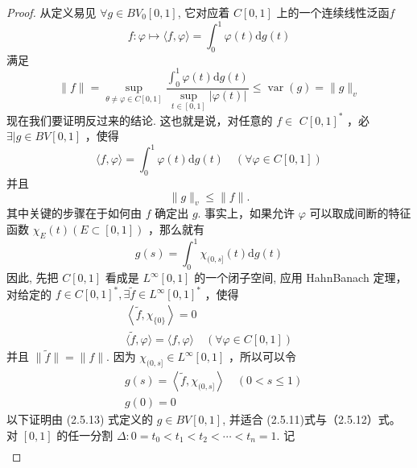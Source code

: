\documentclass[lang=cn,newtx,10pt,scheme=chinese,thmcnt=chapter]{elegantbook}
\newcommand{\dif}{\mathrm{d}}
\begin{document}
\begin{proof}
从定义易见 $\forall g \in B V_0[0,1]$, 它对应着 $C[0,1]$ 上的一个连续线性泛函$f$
\begin{equation*}
f:\varphi \mapsto\langle f, \varphi\rangle=\int_0^1 \varphi(t) \dif g(t)
\end{equation*}
满足
\begin{equation*}
\|f\|=\sup\limits_{\theta\neq \varphi\in C[0,1]}\frac{\int_0^1 \varphi(t) \dif g(t)}{\sup\limits_{t\in [0,1]}|\varphi(t)|} \leqslant \operatorname{var}(g)=\|g\|_v
\end{equation*}
现在我们要证明反过来的结论. 这也就是说，对任意的 $f \in$ $C[0,1]^*$ ，必 $\exists \mid g \in B V[0,1]$ ，使得
\begin{equation*}
\langle f, \varphi\rangle=\int_0^1 \varphi(t) \dif g(t) \quad(\forall \varphi \in C[0,1])
\end{equation*}
并且
\begin{equation*}
\|g\|_v \leqslant\|f\| .
\end{equation*}
其中关键的步骤在于如何由 $f$ 确定出 $g$. 事实上，如果允许 $\varphi$ 可以取成间断的特征函数 $\chi_E(t)(E \subset[0,1])$ ，那么就有
\begin{equation*}
g(s)=\int_0^1 \chi_{(0, s]}(t) \dif g(t)
\end{equation*}
因此, 先把 $C[0,1]$ 看成是 $L^{\infty}[0,1]$ 的一个闭子空间, 应用 HahnBanach 定理，对给定的 $f \in C[0,1]^*, \exists \widetilde{f} \in L^{\infty}[0,1]^*$ ，使得
\begin{equation*}
\begin{gathered}
\left\langle\widetilde{f}, \chi_{\{0\}}\right\rangle=0 \\
\langle\widetilde{f}, \varphi\rangle=\langle f, \varphi\rangle \quad(\forall \varphi \in C[0,1])
\end{gathered}
\end{equation*}
并且 $\|\widetilde{f}\|=\|f\|$. 因为 $\chi_{(0, s]} \in L^{\infty}[0,1]$ ，所以可以令
\begin{equation*}
\begin{aligned}
& g(s)=\left\langle\widetilde{f}, \chi_{(0, s]}\right\rangle \quad(0<s \leqslant 1) \\
& g(0)=0
\end{aligned}
\end{equation*}
以下证明由 (2.5.13) 式定义的 $g \in B V[0,1]$, 并适合 (2.5.11)式与（2.5.12）式。
对 $[0,1]$ 的任一分割 $\Delta: 0=t_0<t_1<t_2<\cdots<t_n=1$. 记
\begin{equation*}
\begin{gathered}

\end{gathered}
\end{equation*}
\end{proof}
\end{document}
